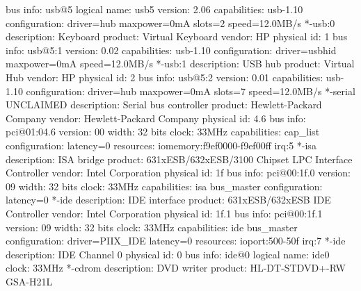 \documentclass[mingoth,a4paper]{jsarticle}
\begin{document}
{{{{{{{{{\begin{commandline}
                   bus info: usb@5
                   logical name: usb5
                   version: 2.06
                   capabilities: usb-1.10
                   configuration: driver=hub maxpower=0mA slots=2 speed=12.0MB/s
                 *-usb:0
                      description: Keyboard
                      product: Virtual Keyboard
                      vendor: HP
                      physical id: 1
                      bus info: usb@5:1
                      version: 0.02
                      capabilities: usb-1.10
                      configuration: driver=usbhid maxpower=0mA speed=12.0MB/s
                 *-usb:1
                      description: USB hub
                      product: Virtual Hub
                      vendor: HP
                      physical id: 2
                      bus info: usb@5:2
                      version: 0.01
                      capabilities: usb-1.10
                      configuration: driver=hub maxpower=0mA slots=7 speed=12.0MB/s
           *-serial UNCLAIMED
                description: Serial bus controller
                product: Hewlett-Packard Company
                vendor: Hewlett-Packard Company
                physical id: 4.6
                bus info: pci@01:04.6
                version: 00
                width: 32 bits
                clock: 33MHz
                capabilities: cap_list
                configuration: latency=0
                resources: iomemory:f9ef0000-f9ef00ff irq:5
        *-isa
             description: ISA bridge
             product: 631xESB/632xESB/3100 Chipset LPC Interface Controller
             vendor: Intel Corporation
             physical id: 1f
             bus info: pci@00:1f.0
             version: 09
             width: 32 bits
             clock: 33MHz
             capabilities: isa bus_master
             configuration: latency=0
        *-ide
             description: IDE interface
             product: 631xESB/632xESB IDE Controller
             vendor: Intel Corporation
             physical id: 1f.1
             bus info: pci@00:1f.1
             version: 09
             width: 32 bits
             clock: 33MHz
             capabilities: ide bus_master
             configuration: driver=PIIX_IDE latency=0
             resources: ioport:500-50f irq:7
           *-ide
                description: IDE Channel 0
                physical id: 0
                bus info: ide@0
                logical name: ide0
                clock: 33MHz
              *-cdrom
                   description: DVD writer
                   product: HL-DT-STDVD+-RW GSA-H21L

\end{commandline}}}}}}}}}}
\end{document}

